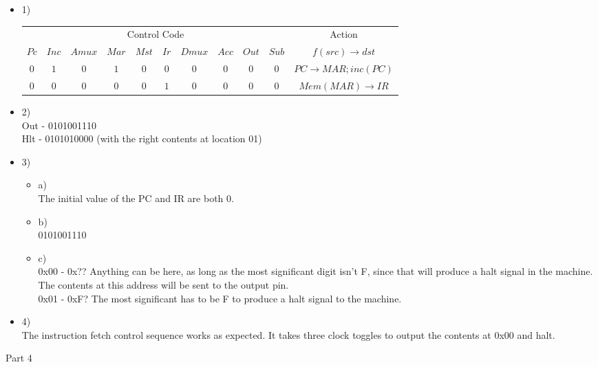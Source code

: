 \documentclass{article}
\begin{document}
\begin{itemize}
  \item
    1)\\
    \begin{tabular}{cccccccccc|c}
    \multicolumn{10}{c|}{Control Code} & Action \\
    $Pc$ & $Inc$ & $Amux$ & $Mar$ & $Mst$ & $Ir$ & $Dmux$ & $Acc$ & $Out$ & $Sub$ & $f(src)\to dst$ \\ \hline
    $0$  & $1$   & $0$    & $1$   & $0$   & $0$  & $0$    & $0$   & $0$   & $0$   & $PC\to MAR;inc(PC)$ \\
    $0$  & $0$   & $0$    & $0$   & $0$   & $1$  & $0$    & $0$   & $0$   & $0$   & $Mem(MAR)\to IR$ \\
    \end{tabular}
  \item
    2)\\
    Out - 0101001110\\
    Hlt - 0101010000 (with the right contents at location 01)\\
  \item
    3)\\
    \begin{itemize}
      \item
        a)\\
        The initial value of the PC and IR are both 0.
      \item
        b)\\
        0101001110
      \item
        c)\\
        0x00 - 0x?? Anything can be here, as long as the most significant digit isn't F, since that will produce a halt signal in the machine. The contents at this address will be sent to the output pin.\\
        0x01 - 0xF? The most significant has to be F to produce a halt signal to the machine.
    \end{itemize}
  \item
    4)\\
    The instruction fetch control sequence works as expected. It takes three clock toggles to output the contents at 0x00 and halt.
\end{itemize}
Part 4
\end{document}
